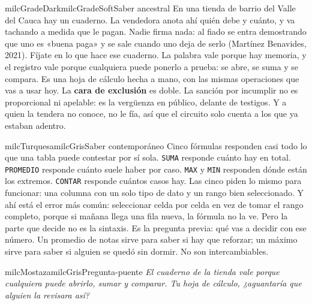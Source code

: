 \documentclass[11pt,letterpaper]{article}
\begin{document}
\begin{softbox}{milcGradeDark}{milcGradeSoft}{Saber ancestral}
En una tienda de barrio del Valle del Cauca hay un cuaderno. La vendedora anota ahí quién debe y cuánto, y va tachando a medida que le pagan. Nadie firma nada: al fiado se entra demostrando que uno es «buena paga» y se sale cuando uno deja de serlo (Martínez Benavides, 2021). Fíjate en lo que hace ese cuaderno. La palabra vale porque hay memoria, y el registro vale porque cualquiera puede ponerlo a prueba: se abre, se suma y se compara. Es una hoja de cálculo hecha a mano, con las mismas operaciones que vas a usar hoy. La \textbf{cara de exclusión} es doble. La sanción por incumplir no es proporcional ni apelable: es la vergüenza en público, delante de testigos. Y a quien la tendera no conoce, no le fía, así que el circuito solo cuenta a los que ya estaban adentro.\par{}
\end{softbox}

\begin{softbox}{milcTurquesa}{milcGris}{Saber contemporáneo}
Cinco fórmulas responden casi todo lo que una tabla puede contestar por sí sola. \texttt{SUMA} responde cuánto hay en total. \texttt{PROMEDIO} responde cuánto suele haber por caso. \texttt{MAX} y \texttt{MIN} responden dónde están los extremos. \texttt{CONTAR} responde cuántos casos hay. Las cinco piden lo mismo para funcionar: una columna con un solo tipo de dato y un rango bien seleccionado. Y ahí está el error más común: seleccionar celda por celda en vez de tomar el rango completo, porque si mañana llega una fila nueva, la fórmula no la ve. Pero la parte que decide no es la sintaxis. Es la pregunta previa: qué vas a decidir con ese número. Un promedio de notas sirve para saber si hay que reforzar; un máximo sirve para saber si alguien se quedó sin dormir. No son intercambiables.
\end{softbox}

\begin{softbox}{milcMostaza}{milcGris}{Pregunta-puente}
\textit{El cuaderno de la tienda vale porque cualquiera puede abrirlo, sumar y comparar. Tu hoja de cálculo, ¿aguantaría que alguien la revisara así?}
\end{softbox}
\end{document}

